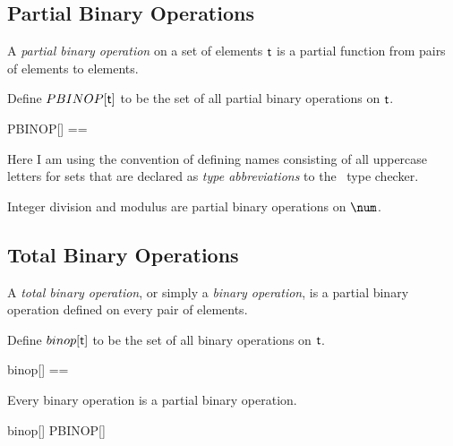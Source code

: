 \documentclass{amsart}
\begin{document}
\subsection{Partial Binary Operations}

A \textit{partial binary operation} on a set of elements $\mathsf{t}$ 
is a partial function from pairs of elements to elements.

Define $PBINOP[\mathsf{t}]$ to be the set of all partial binary operations on $\mathsf{t}$.

\begin{zed}
	PBINOP[\genT] == \genT \cross \genT \pfun \genT
\end{zed}


Here I am using the convention of defining names consisting of all uppercase letters for sets that are 
declared as \textit{type abbreviations} to the \fuzz\ type checker.

\begin{example}

Integer division and modulus are partial binary operations on $\num$.


\end{example}

\subsection{Total Binary Operations}

A \textit{total binary operation}, or simply a \textit{binary operation}, is a partial binary operation defined on
every pair of elements.

Define $binop[\mathsf{t}]$ to be the set of all binary operations on $\mathsf{t}$.

\begin{zed}
	binop[\genT] == \genT \cross \genT \fun \genT
\end{zed}

\begin{remark} Every binary operation is a partial binary operation.

\begin{zed}
	binop[\setT] \subseteq PBINOP[\setT]
\end{zed}

\end{remark}
\end{document}
